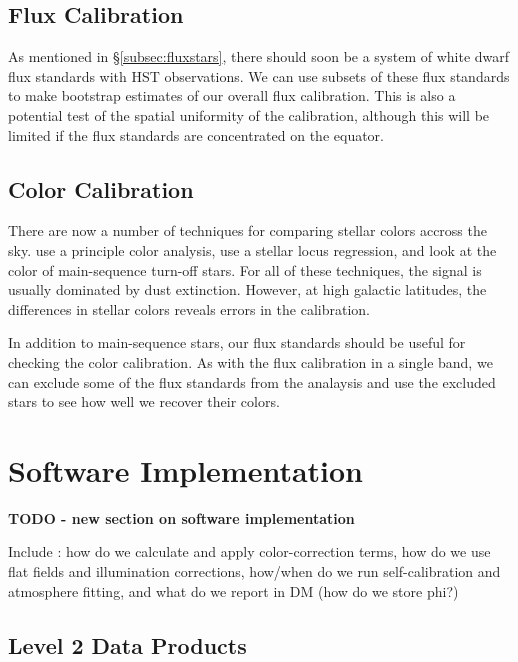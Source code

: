\documentclass[12pt,preprint]{aastex}
\begin{document}
\subsection{Flux Calibration}

As mentioned in \S\ref{subsec:fluxstars}, there should soon be a
system of white dwarf flux standards with HST observations.  We can
use subsets of these flux standards to make bootstrap estimates of our
overall flux calibration.  This is also a potential test of the
spatial uniformity of the calibration, although this will be limited
if the flux standards are concentrated on the equator.

\subsection{Color Calibration}

There are now a number of techniques for comparing stellar colors
accross the sky.  \citet{Ivezic04} use a principle color analysis,
\citet{High09} use a stellar locus regression, and \citet{Schlafly10}
look at the color of main-sequence turn-off stars.  For all of these
techniques, the signal is usually dominated by dust extinction.
However, at high galactic latitudes, the differences in stellar colors
reveals errors in the calibration.

In addition to main-sequence stars, our flux standards should be
useful for checking the color calibration.  As with the flux
calibration in a single band, we can exclude some of the flux
standards from the analaysis and use the excluded stars to see how
well we recover their colors.


\section{Software Implementation}
\label{sec:software}

{\bf TODO - new section on software implementation } 

Include : how do we calculate and apply color-correction terms, how do
we use flat fields and illumination corrections, how/when do we run
self-calibration and atmosphere fitting, and what do we report in DM
(how do we store phi?)
\subsection{Level 2 Data Products}




\end{document}
